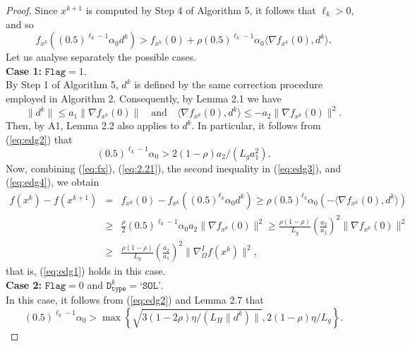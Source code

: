 \documentclass[10pt,a4paper]{amsart}
\begin{document}
\begin{proof}
Since $x^{k+1}$ is computed by Step 4 of Algorithm 5, it follows that $\ell_{k}>0$, and so
\begin{equation}
f_{x^{k}}((0.5)^{\ell_{k}-1}\alpha_{0}d^{k})>f_{x^{k}}(0)+\rho(0.5)^{\ell_{k}-1}\alpha_{0}\langle\nabla f_{x^{k}}(0),d^{k}\rangle.
\label{eq:edg2}
\end{equation}
Let us analyse separately the possible cases.
\\[0.2cm]
\noindent\textbf{Case 1:} $\texttt{Flag}=1$.
\\[0.2cm]
\noindent By Step 1 of Algorithm 5, $d^{k}$ is defined by the same correction procedure employed in Algorithm 2. Consequently, by Lemma 2.1 we have
\begin{equation}
\|d^{k}\|\leq a_{1}\|\nabla f_{x^{k}}(0)\|\quad\text{and}\quad \langle\nabla f_{x^{k}}(0),d^{k}\rangle\leq -a_{2}\|\nabla f_{x^{k}}(0)\|^{2}.
\label{eq:edg3}
\end{equation}
Then, by A1, Lemma 2.2 also applies to $d^{k}$. In particular, it follows from (\ref{eq:edg2}) that
\begin{equation}
(0.5)^{\ell_{k}-1}\alpha_{0}> 2(1-\rho)a_{2} / (L_{g}a_{1}^{2}).
\label{eq:edg4}
\end{equation}
Now, combining (\ref{eq:fx}), (\ref{eq:2.21}), the second inequality in (\ref{eq:edg3}), and (\ref{eq:edg4}), we obtain
\small
\begin{eqnarray*}
f(x^{k})-f(x^{k+1})&=& f_{x^{k}}(0)-f_{x^{k}}((0.5)^{\ell_{k}}\alpha_{0}d^{k})\geq\rho (0.5)^{\ell_{k}}\alpha_{0}\left(-\langle\nabla f_{x^{k}}(0),d^{k}\rangle\right)\\
&\geq &\frac{\rho}{2}(0.5)^{\ell_{k}-1}\alpha_{0}a_{2}\|\nabla f_{x^{k}}(0)\|^{2}\geq\frac{\rho(1-\rho)}{L_{g}}\left(\frac{a_{2}}{a_{1}}\right)^{2}\|\nabla f_{x^{k}}(0)\|^{2}\\
&\geq &\frac{\rho (1-\rho)}{L_{g}}\left(\frac{a_{2}}{a_{1}}\right)^{2}\|\nabla_{\Omega}^{I}f(x^{k})\|^{2},
\end{eqnarray*}
\normalsize
that is, (\ref{eq:edg1}) holds in this case.
\\[0.2cm]
\noindent\textbf{Case 2:} $\texttt{Flag}=0$ and $\texttt{D}_{\texttt{type}}^{k}=\texttt{`SOL'}$.
\\[0.2cm]
\noindent In this case, it follows from (\ref{eq:edg2}) and Lemma 2.7 that
\small
\begin{equation}
(0.5)^{\ell_{k}-1}\alpha_{0}>\max\left\{\sqrt{3(1-2\rho)\eta/(L_{H}\|d^{k})\|},2(1-\rho)\eta/L_{g}\right\}.
\label{eq:edg5}
\end{equation}

\end{proof}
\end{document}
